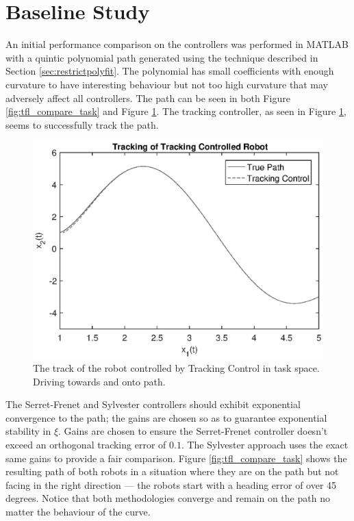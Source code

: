 \documentclass[oneside, 11pt]{book}
\begin{document}
\section{Baseline Study}
An initial performance comparison on the controllers was performed in MATLAB with a quintic polynomial path generated using the technique described in Section \ref{sec:restrictpolyfit}. The polynomial has small coefficients with enough curvature to have interesting behaviour but not too high curvature that may adversely affect all controllers. The path can be seen in both Figure \ref{fig:tfl_compare_task} and Figure \ref{fig:track}. The tracking controller, as seen in Figure \ref{fig:track}, seems to successfully track the path.
\begin{figure}[H]
    \centering
    \includegraphics{images/tracking_control.eps}
    \caption{The track of the robot controlled by Tracking Control in task space. Driving towards and onto path.}
    \label{fig:track}
\end{figure}

The Serret-Frenet and Sylvester controllers should exhibit exponential convergence to the path; the gains are chosen so as to guarantee exponential stability in $\xi$. Gains are chosen to ensure the Serret-Frenet controller doesn't exceed an orthogonal tracking error of $0.1$. The Sylvester approach uses the exact same gains to provide a fair comparison. Figure \ref{fig:tfl_compare_task} shows the resulting path of both robots in a situation where they are on the path but not facing in the right direction --- the robots start with a heading error of over 45 degrees. Notice that both methodologies converge and remain on the path no matter the behaviour of the curve.
\end{document}
